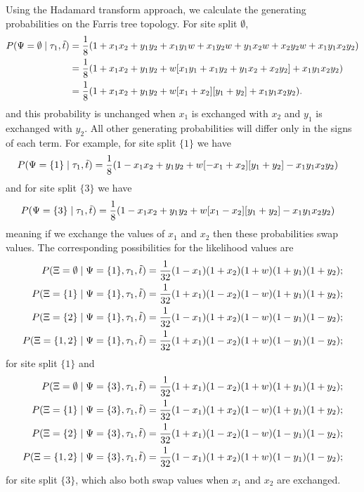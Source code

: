Using the Hadamard transform approach, we calculate the generating probabilities on the Farris tree topology.
For site split $\emptyset$,
\begin{align*}
    P(\Psi=\emptyset\mid \tau_1, \tilde{t}) & = \frac{1}{8} (1 + x_1x_2 +  y_1y_2 +  x_1y_1w + x_1y_2w + y_1x_2w + x_2y_2w + x_1y_1x_2y_2) \\
                                              & = \frac{1}{8} (1 + x_1x_2 +  y_1y_2 +  w[x_1y_1 + x_1y_2 + y_1x_2 + x_2y_2] + x_1y_1x_2y_2) \\
                                              & = \frac{1}{8} (1 + x_1x_2 +  y_1y_2 +  w[x_1 + x_2][y_1 + y_2] + x_1y_1x_2y_2).
\end{align*}
and this probability is unchanged when $x_1$ is exchanged with $x_2$ and $y_1$ is exchanged with $y_2$.
All other generating probabilities will differ only in the signs of each term.
For example, for site split $\{1\}$ we have
\begin{align*}
    P(\Psi=\{1\}\mid \tau_1, \tilde{t}) & = \frac{1}{8} (1 - x_1x_2 +  y_1y_2 +  w[-x_1 + x_2][y_1 + y_2] - x_1y_1x_2y_2)
\end{align*}
and for site split $\{3\}$ we have
\begin{align*}
    P(\Psi=\{3\}\mid \tau_1, \tilde{t}) & = \frac{1}{8} (1 - x_1x_2 +  y_1y_2 +  w[x_1 - x_2][y_1 + y_2] - x_1y_1x_2y_2)
\end{align*}
meaning if we exchange the values of $x_1$ and $x_2$ then these probabilities swap values.
The corresponding possibilities for the likelihood values are
\begin{align*}
    P(\Xi=\emptyset \mid \Psi=\{1\}, \tau_1, \tilde{t}) &= \frac{1}{32}(1-x_1)(1+x_2)(1+w)(1+y_1)(1+y_2); \\
    P(\Xi=\{1\} \mid \Psi=\{1\}, \tau_1, \tilde{t}) &= \frac{1}{32}(1+x_1)(1-x_2)(1-w)(1+y_1)(1+y_2); \\
    P(\Xi=\{2\} \mid \Psi=\{1\}, \tau_1, \tilde{t}) &= \frac{1}{32}(1-x_1)(1+x_2)(1-w)(1-y_1)(1-y_2); \\
    P(\Xi=\{1,2\} \mid \Psi=\{1\}, \tau_1, \tilde{t}) &= \frac{1}{32}(1+x_1)(1-x_2)(1+w)(1-y_1)(1-y_2);
\end{align*}
for site split $\{1\}$ and
\begin{align*}
        P(\Xi=\emptyset \mid \Psi=\{3\}, \tau_1, \tilde{t}) &= \frac{1}{32}(1+x_1)(1-x_2)(1+w)(1+y_1)(1+y_2); \\
    P(\Xi=\{1\} \mid \Psi=\{3\}, \tau_1, \tilde{t}) &= \frac{1}{32}(1-x_1)(1+x_2)(1-w)(1+y_1)(1+y_2); \\
    P(\Xi=\{2\} \mid \Psi=\{3\}, \tau_1, \tilde{t}) &= \frac{1}{32}(1+x_1)(1-x_2)(1-w)(1-y_1)(1-y_2); \\
    P(\Xi=\{1,2\} \mid \Psi=\{3\}, \tau_1, \tilde{t}) &= \frac{1}{32}(1-x_1)(1+x_2)(1+w)(1-y_1)(1-y_2);
\end{align*}
for site split $\{3\}$, which also both swap values when $x_1$ and $x_2$ are exchanged.

